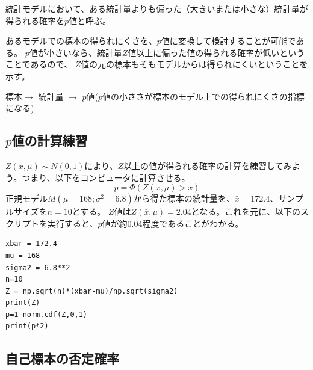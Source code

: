 \begin{defi}
    統計モデルにおいて、ある統計量よりも偏った（大きいまたは小さな）統計量が得られる確率を$p$値と呼ぶ。
\end{defi}

あるモデルでの標本の得られにくさを、$p$値に変換して検討することが可能である。
$p$値が小さいなら、統計量$Z$値以上に偏った値の得られる確率が低いということであるので、
$Z$値の元の標本もそもモデルからは得られにくいということを示す。

\begin{center}
    標本$\rightarrow$ 統計量 $\rightarrow$ $p$値($p$値の小ささが標本のモデル上での得られにくさの指標になる)
\end{center}
\fi




\subsection{$p$値の計算練習}
$Z(\bar{x},\mu)\sim N(0,1)$により、$Z$以上の値が得られる確率の計算を練習してみよう。つまり、以下をコンピュータに計算させる。
\begin{equation*}
    p = \varPhi(Z(\bar{x},\mu)>x)
\end{equation*}
正規モデル$M(\mu=168;\sigma^2=6.8)$から得た標本の統計量を、$\bar{x}=172.4$、サンプルサイズを$n=10$とする。
$Z$値は$Z(\bar{x},\mu)=2.04$となる。これを元に、以下のスクリプトを実行すると、$p$値が約0.04程度であることがわかる。

\begin{lstlisting}
xbar = 172.4
mu = 168
sigma2 = 6.8**2
n=10
Z = np.sqrt(n)*(xbar-mu)/np.sqrt(sigma2)
print(Z)
p=1-norm.cdf(Z,0,1)
print(p*2)
\end{lstlisting}



\subsection{自己標本の否定確率}

